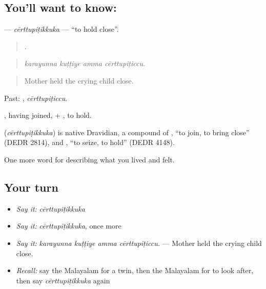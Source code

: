 \subsection*{You'll want to know: }
\textbf{} — \emph{cērttupiṭikkuka} — \textquotedblleft{}to hold close\textquotedblright{}.

\begin{quote}
   .
\end{quote}

\begin{quote}
\emph{karayunna kuṭṭiye amma cērttupiṭiccu.}
\end{quote}

\begin{quote}
Mother held the crying child close.
\end{quote}

Past: , \emph{cērttupiṭiccu}.

, having joined, + , to hold.

\begin{cousinweb}
\textbf{} (\emph{cērttupiṭikkuka}) is native Dravidian, a compound of , \textquotedblleft{}to join, to bring close\textquotedblright{} (DEDR 2814), and , \textquotedblleft{}to seize, to hold\textquotedblright{} (DEDR 4148).
\end{cousinweb}

\begin{grammarlens}[title={What you've built}]
One more word for describing what you lived and felt.
\end{grammarlens}

\subsection*{Your turn}
\begin{itemize}
\raggedright
  \item \emph{Say it:} \emph{cērttupiṭikkuka}
  \item \emph{Say it:} \emph{cērttupiṭikkuka}, once more
  \item \emph{Say it:} \emph{karayunna kuṭṭiye amma cērttupiṭiccu.} — Mother held the crying child close.
  \item \emph{Recall:} say the Malayalam for a twin, then the Malayalam for to look after, then say \emph{cērttupiṭikkuka} again
\end{itemize}


